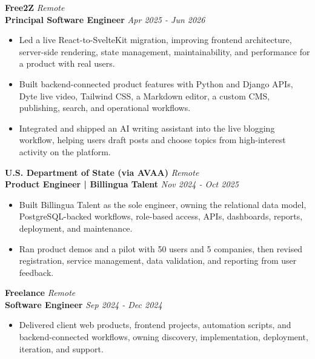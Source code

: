 \documentclass[10pt]{article}
\begin{document}
\vspace{2pt}
\textbf{Free2Z} \hfill \textit{Remote} \\
\textbf{Principal Software Engineer} \hfill \textit{Apr 2025 - Jun 2026}
\begin{itemize}
    \item Led a live React-to-SvelteKit migration, improving frontend architecture, server-side rendering, state management, maintainability, and performance for a product with real users.
    \item Built backend-connected product features with Python and Django APIs, Dyte live video, Tailwind CSS, a Markdown editor, a custom CMS, publishing, search, and operational workflows.
    \item Integrated and shipped an AI writing assistant into the live blogging workflow, helping users draft posts and choose topics from high-interest activity on the platform.
\end{itemize}

\vspace{2pt}
\textbf{U.S. Department of State (via AVAA)} \hfill \textit{Remote} \\
\textbf{Product Engineer | Billingua Talent} \hfill \textit{Nov 2024 - Oct 2025}
\begin{itemize}
    \item Built Billingua Talent as the sole engineer, owning the relational data model, PostgreSQL-backed workflows, role-based access, APIs, dashboards, reports, deployment, and maintenance.
    \item Ran product demos and a pilot with 50 users and 5 companies, then revised registration, service management, data validation, and reporting from user feedback.
\end{itemize}

\vspace{2pt}
\textbf{Freelance} \hfill \textit{Remote} \\
\textbf{Software Engineer} \hfill \textit{Sep 2024 - Dec 2024}
\begin{itemize}
    \item Delivered client web products, frontend projects, automation scripts, and backend-connected workflows, owning discovery, implementation, deployment, iteration, and support.
\end{itemize}
\end{document}
